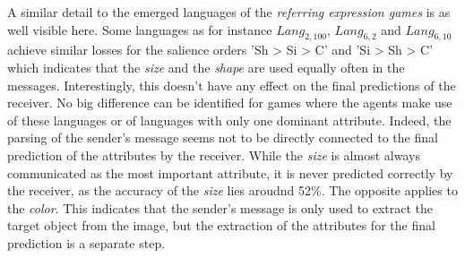 A similar detail to the emerged languages of the \emph{referring expression games} is as well visible here.
Some languages as for instance $Lang_{2,100}$, $Lang_{6,2}$ and $Lang_{6,10}$ achieve similar losses for the salience orders 'Sh > Si > C' and 'Si > Sh > C' which indicates that the \emph{size} and the \emph{shape} are used equally often in the messages.
Interestingly, this doesn't have any effect on the final predictions of the receiver.
No big difference can be identified for games where the agents make use of these languages or of languages with only one dominant attribute.
Indeed, the parsing of the sender's message seems not to be directly connected to the final prediction of the attributes by the receiver.
While the \emph{size} is almost always communicated as the most important attribute, it is never predicted correctly by the receiver, as the accuracy of the \emph{size} lies aroudnd 52\%.
The opposite applies to the \emph{color}.
This indicates that the sender's message is only used to extract the target object from the image, but the extraction of the attributes for the final prediction is a separate step.

